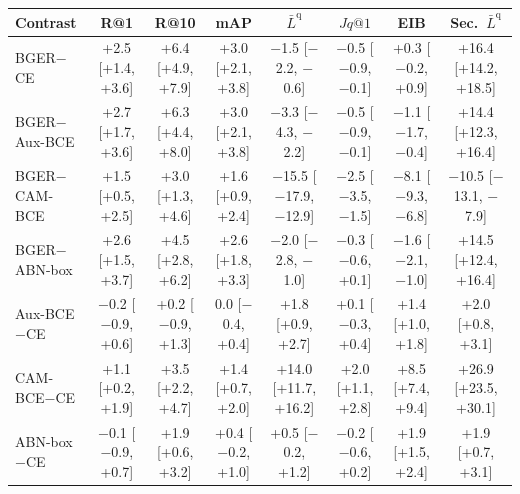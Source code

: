 \begingroup
\captionsetup{type=table}
\centering\footnotesize\setlength{\tabcolsep}{3pt}
\caption{All paired contrasts of the OSLD test set (percentage points; estimate and basic 95\% interval from the shared draws; descriptive except BGER$-$CE R@1 and $\bar L^{\mathrm q}$, the prespecified hypotheses shown in Figure~\ref*{main-fig:effects}).}
\label{tab:osld-contrasts-all}
\begin{tabular}{lccccccc}
\toprule
Contrast & R@1 & R@10 & mAP & $\bar L^{\mathrm q}$ & $Jq@1$ & EIB & Sec.\ $\bar L^{\mathrm q}$\\
\midrule
BGER$-$CE & +2.5 [+1.4, +3.6] & +6.4 [+4.9, +7.9] & +3.0 [+2.1, +3.8] & $-$1.5 [$-$2.2, $-$0.6] & $-$0.5 [$-$0.9, $-$0.1] & +0.3 [$-$0.2, +0.9] & +16.4 [+14.2, +18.5]\\
BGER$-$Aux-BCE & +2.7 [+1.7, +3.6] & +6.3 [+4.4, +8.0] & +3.0 [+2.1, +3.8] & $-$3.3 [$-$4.3, $-$2.2] & $-$0.5 [$-$0.9, $-$0.1] & $-$1.1 [$-$1.7, $-$0.4] & +14.4 [+12.3, +16.4]\\
BGER$-$CAM-BCE & +1.5 [+0.5, +2.5] & +3.0 [+1.3, +4.6] & +1.6 [+0.9, +2.4] & $-$15.5 [$-$17.9, $-$12.9] & $-$2.5 [$-$3.5, $-$1.5] & $-$8.1 [$-$9.3, $-$6.8] & $-$10.5 [$-$13.1, $-$7.9]\\
BGER$-$ABN-box & +2.6 [+1.5, +3.7] & +4.5 [+2.8, +6.2] & +2.6 [+1.8, +3.3] & $-$2.0 [$-$2.8, $-$1.0] & $-$0.3 [$-$0.6, +0.1] & $-$1.6 [$-$2.1, $-$1.0] & +14.5 [+12.4, +16.4]\\
Aux-BCE$-$CE & $-$0.2 [$-$0.9, +0.6] & +0.2 [$-$0.9, +1.3] & 0.0 [$-$0.4, +0.4] & +1.8 [+0.9, +2.7] & +0.1 [$-$0.3, +0.4] & +1.4 [+1.0, +1.8] & +2.0 [+0.8, +3.1]\\
CAM-BCE$-$CE & +1.1 [+0.2, +1.9] & +3.5 [+2.2, +4.7] & +1.4 [+0.7, +2.0] & +14.0 [+11.7, +16.2] & +2.0 [+1.1, +2.8] & +8.5 [+7.4, +9.4] & +26.9 [+23.5, +30.1]\\
ABN-box$-$CE & $-$0.1 [$-$0.9, +0.7] & +1.9 [+0.6, +3.2] & +0.4 [$-$0.2, +1.0] & +0.5 [$-$0.2, +1.2] & $-$0.2 [$-$0.6, +0.2] & +1.9 [+1.5, +2.4] & +1.9 [+0.7, +3.1]\\
\bottomrule
\end{tabular}
\par
\endgroup
